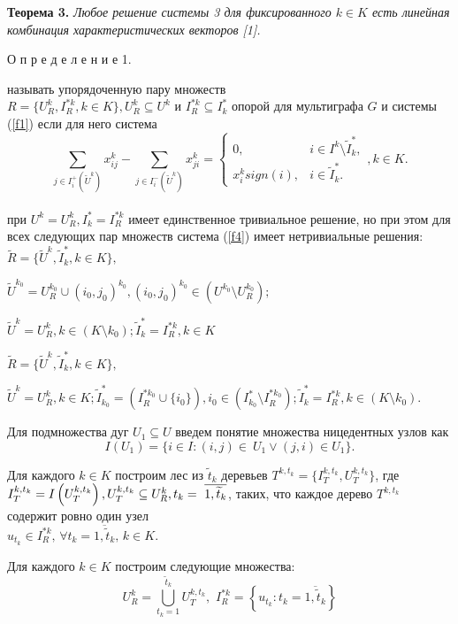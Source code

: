 \documentclass[14pt]{extarticle}%
\begin{document}
\textbf{Теорема 3.} \textit{Любое решение системы 3 для фиксированного $k\in K$ есть линейная комбинация характеристических векторов [1].}

О п р е д е л е н и е 1. { называть упорядоченную пару множеств \\$R=\{U^k_R, I^{*k}_R, k\in K\}, U^k_R\subseteq U^k$ и $I^{*k}_R\subseteq I^*_k$ опорой для мультиграфа $G$ и системы (\ref{f1}) если для него система 
\begin{equation}
     \sum_{j\in I^+_i(\widetilde U^k)} x^k_{ij}-\sum_{j\in I^-_i(\widetilde U^k)}x^k_{ji}=\left\{\begin{matrix}
0, & i\in I^k\setminus \widetilde I^*_k,\\ 
x^k_i sign(i), & i\in \widetilde I^*_k.
\end{matrix}\right., k\in K.\label{f4} 
\end{equation}\\
при $U^k=U^k_R, I^*_k=I^{*k}_R$ имеет единственное тривиальное решение, но при этом для всех следующих пар множеств система (\ref{f4}) имеет нетривиальные решения:\\

$\widetilde R=\{\widetilde{U}^k, \widetilde{I}^*_k, k\in K\},$

$\widetilde{U}^{k_0}=U^{k_0}_R\cup(i_0,j_0)^{k_0}, (i_0,j_0)^{k_0}\in (U^{k_0}\setminus U^{k_0}_R);$

$\widetilde{U}^k=U^k_R, k\in (K\setminus k_0); \widetilde{I}^*_k=I^{*k}_R, k\in K$

$\widetilde R=\{\widetilde{U}^k, \widetilde{I}^*_k, k\in K\},$

$\widetilde{U}^k=U^k_R, k\in K; \widetilde{I}^*_{k_0}=(I^{*k_0}_R\cup \{i_0\}), i_0\in (I^*_{k_0}\setminus I^{*k_0}_R); \widetilde{I}^*_{k}=I^{*k}_R, k\in (K\setminus k_0).
$}

Для подмножества дуг $U_1\subseteq U$ введем понятие множества ницедентных узлов как $$I(U_1)=\{i\in I: (i,j)\in~U_1\vee (j,i)\in U_1\}.$$

Для каждого $k\in K$ построим лес из $\widetilde t_k$ деревьев $T^{k,t_k}=\{I^{k,t_k}_T, U^{k,t_k}_T\}$, где $I^{k,t_k}_T=I\left(U^{k,t_k}_T\right), U^{k,t_k}_T\subseteq U^k_R,\\ t_k=~\overline{1,\widetilde t_k}$, таких, что каждое дерево $T^{k,t_k}$ содержит ровно один узел \\$u_{t_k}\in I^{*k}_R, \,\forall t_k=\overline{1,\widetilde t_k},\, k\in K$.

Для каждого $k\in K$ построим следующие множества:
$$U^k_R=\bigcup_{t_k=1}^{\widetilde t_k}U^{k,t_k}_T,\,\,I^{*k}_R=\left\{u_{t_k}:t_k=\overline{1,\widetilde t_k}\right\}$$
\end{document}

